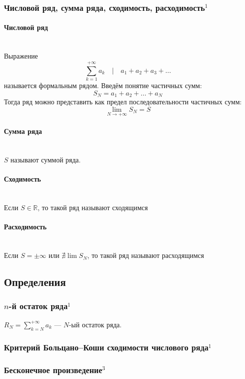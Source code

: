 \documentclass{article}
\let\vanillaparagraph\paragraph
\renewcommand{\paragraph}[1]{\vanillaparagraph{#1}\mbox{}\\}
\begin{document}
\subsubsection{Числовой ряд, сумма ряда, сходимость, расходимость\texorpdfstring{$^1$}{}}
\paragraph{Числовой ряд}
Выражение
$$
\sum_{k=1}^{+\infty} a_k \quad | \quad a_1+a_2+a_3+\ldots
$$
называется формальным рядом. Введём понятие частичных сумм:
$$
S_N = a_1+a_2+\ldots+a_N
$$
Тогда ряд можно представить как предел последовательности частичных сумм:
$$
\lim_{N\rightarrow +\infty} S_N = S
$$

\paragraph{Сумма ряда}
$S$ называют суммой ряда.
\paragraph{Сходимость}
Если $S \in \mathbb{R}$, то такой ряд называют сходящимся
\paragraph{Расходимость}
Если $S = \pm\infty$ или $\nexists \lim S_N$, то такой ряд называют расходящимся



\newpage
\subsection{Определения}

\subsubsection{\texorpdfstring{$n$}{n}-й остаток ряда\texorpdfstring{$^1$}{}}
$R_N = \sum_{k=N}^{+\infty} a_k$ --- $N$-ый остаток ряда.

\subsubsection{Критерий Больцано--Коши сходимости числового ряда\texorpdfstring{$^1$}{}}

\subsubsection{Бесконечное произведение\texorpdfstring{$^3$}{}}
\end{document}
